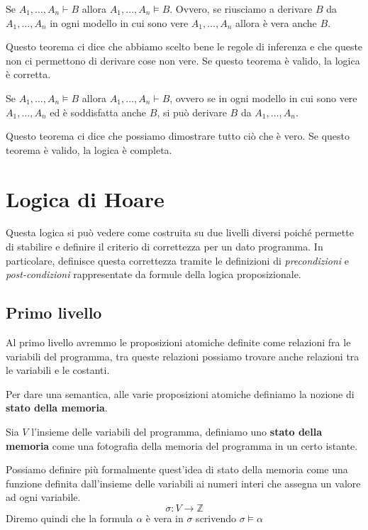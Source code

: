 \begin{teorema}
    Se $A_1, \dots, A_n \vdash B$ allora $A_1, \dots, A_n \models B$. Ovvero, se
    riusciamo a derivare $B$ da $A_1, \dots, A_n$ in ogni modello in cui sono
    vere $A_1, \dots, A_n$ allora è vera anche $B$.
\end{teorema}
Questo teorema ci dice che abbiamo scelto bene le regole di inferenza e che
queste non ci permettono di derivare cose non vere. Se questo teorema è valido,
la logica è corretta.
\begin{teorema}
    Se $A_1, \dots, A_n \models B$ allora $A_1, \dots, A_n \vdash B$, ovvero se
    in ogni modello in cui sono vere $A_1, \dots, A_n$ ed è soddisfatta anche
    $B$, si può derivare $B$ da $A_1, \dots, A_n$.
\end{teorema}
Questo teorema ci dice che possiamo dimostrare tutto ciò che è vero. Se questo
teorema è valido, la logica è completa.
\section{Logica di Hoare}
Questa logica si può vedere come costruita su due livelli diversi poiché permette
di stabilire e definire il criterio di correttezza per un dato programma.
In particolare, definisce questa correttezza tramite le definizioni di
\textit{precondizioni} e \textit{post-condizioni} rappresentate da formule della
logica proposizionale.
\subsection{Primo livello}
Al primo livello avremmo le proposizioni atomiche definite come relazioni fra le
variabili del programma, tra queste relazioni possiamo trovare anche relazioni
tra le variabili e le costanti.

Per dare una semantica, alle varie proposizioni atomiche definiamo la nozione di
\textbf{stato della memoria}.
\begin{definizione}
    Sia $V$ l'insieme delle variabili del programma, definiamo uno \textbf{stato
        della memoria} come una fotografia della memoria del programma in un
    certo istante.

    Possiamo definire più formalmente quest'idea di stato della memoria come una
    funzione definita dall'insieme delle variabili ai numeri interi che assegna
    un valore ad ogni variabile.
    \begin{equation}
        \sigma: V \to \mathbb{Z}
    \end{equation}
    Diremo quindi che la formula $\alpha$ è vera in $\sigma$ scrivendo $\sigma
        \models \alpha$
\end{definizione}
